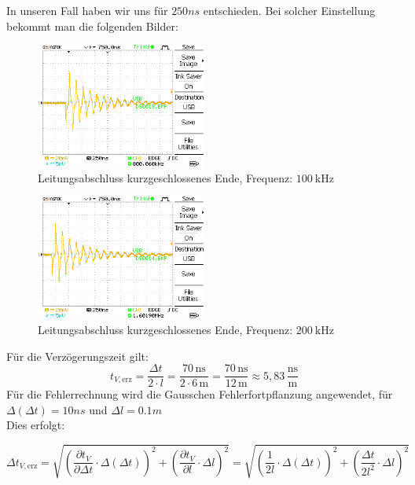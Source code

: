 \documentclass{article}
\begin{document}
                In unseren Fall haben wir uns für $250ns$ entschieden. Bei solcher Einstellung 
                bekommt man die folgenden Bilder: 
				\begin{figure}[H]
					\centering
					\includegraphics[width=0.5\textwidth]{MesswerteVersuch1/DS0013.png}	

					\caption{Leitungsabschluss kurzgeschlossenes Ende, Frequenz: $\SI{100}{\kilo\hertz}$}
					\label{fig:DS0013}
				\end{figure}
				\begin{figure}[H]
					\centering
					\includegraphics[width=0.5\textwidth]{MesswerteVersuch1/DS0014.png}	

					\caption{Leitungsabschluss kurzgeschlossenes Ende, Frequenz: $\SI{200}{\kilo\hertz}$}
					\label{fig:DS0014}
				\end{figure}

                Für die Verzögerungszeit gilt: 
                \[
t_{V,\text{erz}} = \frac{\Delta t}{2 \cdot l} = \frac{70\,\text{ns}}{2 \cdot 6\,\text{m}} = \frac{70\,\text{ns}}{12\,\text{m}} \approx 5{,}83\,\frac{\text{ns}}{\text{m}}
\]
Für die Fehlerrechnung wird die Gausschen Fehlerfortpflanzung angewendet, für $\Delta(\Delta t)=10ns$ und $\Delta l=0.1m$
\\ Dies erfolgt:

\[
\Delta t_{V,\text{erz}} =
\sqrt{
\left( \frac{\partial t_V}{\partial \Delta t} \cdot \Delta(\Delta t) \right)^2 +
\left( \frac{\partial t_V}{\partial l} \cdot \Delta l \right)^2
}
=
\sqrt{
\left( \frac{1}{2l} \cdot \Delta(\Delta t) \right)^2 +
\left( \frac{\Delta t}{2l^2} \cdot \Delta l \right)^2
}
\]
\end{document}
